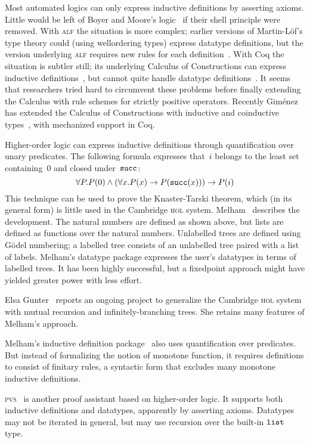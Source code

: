 \documentclass[12pt]{article}
\def\succ{\hbox{\tt succ}}
\newcommand\lst{\hbox{\tt list}}
\begin{document}
Most automated logics can only express inductive definitions by asserting
axioms.  Little would be left of Boyer and Moore's logic~\cite{bm79} if their
shell principle were removed.  With \textsc{alf} the situation is more
complex; earlier versions of Martin-L\"of's type theory could (using
wellordering types) express datatype definitions, but the version underlying
\textsc{alf} requires new rules for each definition~\cite{dybjer91}.  With Coq
the situation is subtler still; its underlying Calculus of Constructions can
express inductive definitions~\cite{huet88}, but cannot quite handle datatype
definitions~\cite{paulin-tlca}.  It seems that researchers tried hard to
circumvent these problems before finally extending the Calculus with rule
schemes for strictly positive operators.  Recently Gim{\'e}nez has extended
the Calculus of Constructions with inductive and coinductive
types~\cite{gimenez-codifying}, with mechanized support in Coq.

Higher-order logic can express inductive definitions through quantification
over unary predicates.  The following formula expresses that~$i$ belongs to the
least set containing~0 and closed under~$\succ$:
\[ \forall P. P(0)\conj (\forall x.P(x)\imp P(\succ(x))) \imp P(i) \] 
This technique can be used to prove the Knaster-Tarski theorem, which (in its
general form) is little used in the Cambridge \textsc{hol} system.
Melham~\cite{melham89} describes the development.  The natural numbers are
defined as shown above, but lists are defined as functions over the natural
numbers.  Unlabelled trees are defined using G\"odel numbering; a labelled
tree consists of an unlabelled tree paired with a list of labels.  Melham's
datatype package expresses the user's datatypes in terms of labelled trees.
It has been highly successful, but a fixedpoint approach might have yielded
greater power with less effort.

Elsa Gunter~\cite{gunter-trees} reports an ongoing project to generalize the
Cambridge \textsc{hol} system with mutual recursion and infinitely-branching
trees.  She retains many features of Melham's approach.

Melham's inductive definition package~\cite{camilleri92} also uses
quantification over predicates.  But instead of formalizing the notion of
monotone function, it requires definitions to consist of finitary rules, a
syntactic form that excludes many monotone inductive definitions.

\textsc{pvs}~\cite{pvs-language} is another proof assistant based on
higher-order logic.  It supports both inductive definitions and datatypes,
apparently by asserting axioms.  Datatypes may not be iterated in general, but
may use recursion over the built-in $\lst$ type.
\end{document}
